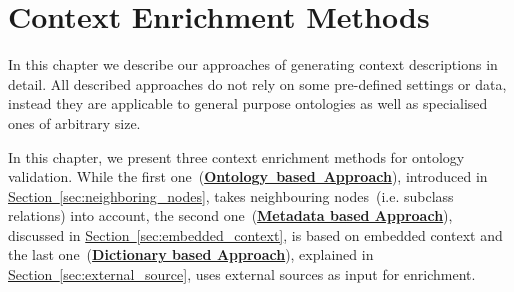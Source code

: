 \chapter{Context Enrichment Methods}\label{chap:context_enrichment_methods}
In this chapter we describe our approaches of generating context descriptions in detail. All described approaches do not rely on some pre-defined settings or data, instead they are applicable to general purpose ontologies as well as specialised ones of arbitrary size.

In this chapter, we present three context enrichment methods for ontology validation. While the first one~(\hyperref[sec:enrichment_ontology_approach]{\textbf{Ontology~based~Approach}}), introduced in \hyperref[sec:neighboring_nodes]{Section~\ref*{sec:neighboring_nodes}}, takes neighbouring nodes~(i.e. subclass relations) into account, the second one~(\hyperref[sec:enrichment_metaData_approach]{\textbf{Metadata based Approach}}), discussed in \hyperref[sec:embedded_context]{Section~\ref*{sec:embedded_context}}, is based on embedded context and the last one~(\hyperref[sec:enrichment_dictionary_approach]{\textbf{Dictionary based Approach}}), explained in \hyperref[sec:external_source]{Section~\ref*{sec:external_source}}, uses external sources as input for enrichment. 












